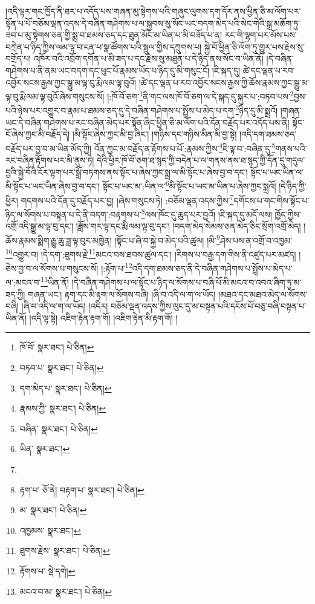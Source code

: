 །འདི་ལྟར་གང་ཁྱོད་ནི་ཐར་པ་འདོད་པས་གཞན་མུ་སྟེགས་པའི་གཞུང་ལུགས་དག་དོར་ནས་ཕྱིན་ཅི་མ་ལོག་པར་སྟོན་པ་པོ་བཅོམ་ལྡན་འདས་དེ་བཞིན་གཤེགས་པ་ལ་སྐྱབས་སུ་སོང་ཡང་བདག་མེད་པའི་སེང་གེའི་སྒྲ་མཆོག་ཏུ་ཟབ་པ་མུ་སྟེགས་ཅན་གྱི་སྨྲ་བ་ཐམས་ཅད་དང་ཐུན་མོང་མ་ཡིན་པ་མི་བཟོད་པ་ན། རང་གི་ལྷག་པར་མོས་པས་བཀྲེན་པ་ཉིད་ཀྱིས་ལམ་ལྟ་བ་ངན་པ་སྣ་ཚོགས་པའི་སྦྲུལ་གྱིས་དཀྲུགས་པ། སྐྱེ་བོ་ཕྱིན་ཅི་ལོག་ཏུ་གྱུར་པས་རྗེས་སུ་བགྲོད་པ། འཁོར་བའི་འབྲོག་དགོན་པ་མི་ཟད་པ་དང་རྗེས་སུ་མཐུན་པ་དེ་ཉིད་ནས་སོང་བ་ཡིན་ནོ། །དེ་བཞིན་གཤེགས་པ་ནི་ནམ་ཡང་བདག་དང་ཕུང་པོ་རྣམས་ཡོད་པ་ཉིད་དུ་མི་གསུང་ངོ། །ཇི་སྐད་དུ། ཚེ་དང་ལྡན་པ་རབ་འབྱོར་སངས་རྒྱས་ཀྱང་སྒྱུ་མ་ལྟ་བུ་རྨི་ལམ་ལྟ་བུའོ། །ཚེ་དང་ལྡན་པ་རབ་འབྱོར་སངས་རྒྱས་ཀྱི་ཆོས་རྣམས་ཀྱང་སྒྱུ་མ་ལྟ་བུ་རྨི་ལམ་ལྟ་བུའོ་ཞེས་གསུངས་སོ། །:ཁོ་བོ་ཅག་\footnote{ཁོ་བོ་  སྣར་ཐང་།  པེ་ཅིན། }ནི་གང་ལས་ཁོ་བོ་ཅག་ལ་དེ་སྐད་དུ་སྐུར་པ་:བཏབ་པས་\footnote{བཏབ་པ་  སྣར་ཐང་།  པེ་ཅིན། }བྱས་པའི་ཉེས་པར་འགྱུར་བ་རྣམ་པ་ཐམས་ཅད་དུ་དེ་བཞིན་གཤེགས་པ་སྤྲོས་པ་མེད་པ་དག་\footnote{དག་མེད་པ་  སྣར་ཐང་།  པེ་ཅིན། }ཉིད་དུ་མི་སྨྲའོ། །གཞན་ཡང་དེ་བཞིན་གཤེགས་པ་རང་བཞིན་མེད་པར་སྟོན་ཞིང་ཕྱིན་ཅི་མ་ལོག་པའི་དོན་བརྗོད་པར་འདོད་པས་ནི། སྟོང་ངོ་ཞེས་ཀྱང་མི་བརྗོད་དེ། །མི་སྟོང་ཞེས་ཀྱང་མི་བྱ་ཞིང་། །གཉིས་དང་གཉིས་མིན་མི་བྱ་སྟེ། །འདི་དག་ཐམས་ཅད་བརྗོད་པར་བྱ་བ་མ་ཡིན་མོད་ཀྱི། འོན་ཀྱང་མ་བརྗོད་ན་རྟོགས་པ་པོ་:རྣམས་ཀྱིས་\footnote{རྣམས་ཀྱི་  སྣར་ཐང་།  པེ་ཅིན། }ཇི་ལྟ་བ་:བཞིན་དུ་\footnote{བཞིན་  སྣར་ཐང་།  པེ་ཅིན། }གནས་པའི་རང་བཞིན་རྟོགས་པར་མི་ནུས་ཏེ། དེའི་ཕྱིར་ཁོ་བོ་ཅག་ཐ་སྙད་ཀྱི་བདེན་པ་ལ་གནས་ནས་ཐ་སྙད་ཀྱི་དོན་དུ་གདུལ་བྱའི་སྐྱེ་བོའི་ངོར་ལྟག་པར་སྒྲོ་བཏགས་ནས་སྟོང་པ་ཞེས་ཀྱང་སྨྲ་ལ་མི་སྟོང་པ་ཞེས་བྱ་བ་དང་། སྟོང་པ་ཡང་ཡིན་ལ་མི་སྟོང་པ་ཡང་ཡིན་ཞེས་བྱ་བ་དང་། སྟོང་པ་ཡང་མ་:ཡིན་ལ་\footnote{ཡིན་  སྣར་ཐང་། }མི་སྟོང་པ་ཡང་མ་ཡིན་པ་ཞེས་ཀྱང་སྨྲའོ། །དེ་ཉིད་ཀྱི་ཕྱིར། གདགས་པའི་དོན་དུ་བརྗོད་པར་བྱ། །ཞེས་གསུངས་ཏེ། :བཅོམ་ལྡན་འདས་ཀྱིས་\footnote{}དགོངས་པ་གང་གིས་སྟོང་པ་ཉིད་ལ་སོགས་པ་བསྟན་པ་དེ་ནི་བདག་:བརྟགས་པ་\footnote{རྟག་པ་  ཅོ་ནེ། བརྟག་པ་  སྣར་ཐང་།  པེ་ཅིན། }ལས་ཁོང་དུ་ཆུད་པར་བྱའོ། །ཇི་སྐད་དུ་མདོ་ལས། ཁྱོད་ཀྱིས་འགྲོ་འདི་སྒྱུ་མ་ལྟ་བུ་དང་། །ཟློས་གར་ལྟ་དང་རྨི་ལམ་ལྟ་བུ་དང་། །བདག་མེད་སེམས་ཅན་མེད་ཅིང་སྲོག་འགྲོ་མེད། །ཆོས་རྣམས་སྨིག་རྒྱུ་ཆུ་ཟླ་ལྟ་བུར་མཁྱེན། །སྟོང་པ་ཞི་བ་སྐྱེ་བ་མེད་པའི་ཚུལ། །མི་\footnote{མ་  སྣར་ཐང་།  པེ་ཅིན། }ཤེས་པས་ན་འགྲོ་བ་འཁྱམ་\footnote{འཁྱམས་  སྣར་ཐང་། }འགྱུར་བ། །དེ་དག་:ཐུགས་རྗེ་\footnote{ཐུགས་རྗེས་  སྣར་ཐང་།  པེ་ཅིན། }མངའ་བས་ཐབས་ཚུལ་དང་། །རིགས་པ་བརྒྱ་དག་གིས་ནི་འཛུད་པར་མཛད། །ཅེས་བྱ་བ་ལ་སོགས་པ་གསུངས་སོ། །:རྟོག་པ་\footnote{རྟོགས་པ་  སྡེ་དགེ། }འདི་དག་ཐམས་ཅད་ནི་དེ་བཞིན་གཤེགས་པ་སྤྲོས་པ་མེད་པ་ལ་:མངའ་བ་\footnote{མངའ་བ་མ་  སྣར་ཐང་།  པེ་ཅིན། }ཡིན་ནོ། །དེ་བཞིན་གཤེགས་པ་ལ་སྟོང་པ་ཉིད་ལ་སོགས་པ་བཞི་པོ་མི་མངའ་བ་འབའ་ཞིག་ཏུ་མ་ཟད་ཀྱི། གཞན་ཡང་། རྟག་དང་མི་རྟག་ལ་སོགས་བཞི། །ཞི་བ་འདི་ལ་ག་ལ་ཡོད། །མཐའ་དང་མཐའ་མེད་ལ་སོགས་བཞི། །ཞི་བ་འདི་ལ་ག་ལ་ཡོད། །འདིར། བཅོམ་ལྡན་འདས་ཀྱིས་ལུང་དུ་མ་བསྟན་པའི་དངོས་པོ་བཅུ་བཞི་བསྟན་པ་ཡིན་ནོ། །འདི་ལྟ་སྟེ། འཇིག་རྟེན་རྟག་གོ། །འཇིག་རྟེན་མི་རྟག་གོ། །

